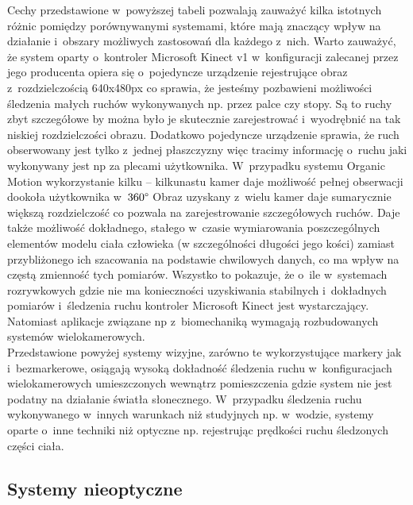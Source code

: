 Cechy przedstawione w~powyższej tabeli pozwalają zauważyć kilka istotnych różnic pomiędzy porównywanymi systemami, które mają znaczący wpływ na działanie i~obszary możliwych zastosowań dla każdego z~nich. Warto zauważyć, że system oparty o~kontroler Microsoft Kinect v1 w~konfiguracji zalecanej przez jego producenta opiera się o~pojedyncze urządzenie rejestrujące obraz z~rozdzielczością 640x480px co sprawia, że jesteśmy pozbawieni możliwości śledzenia małych ruchów wykonywanych np. przez palce czy stopy. Są to ruchy zbyt szczegółowe by można było je skutecznie zarejestrować i~wyodrębnić na tak niskiej rozdzielczości obrazu. Dodatkowo pojedyncze urządzenie sprawia, że ruch obserwowany jest tylko z~jednej płaszczyzny więc tracimy informację o~ruchu jaki wykonywany jest np za plecami użytkownika. W~przypadku systemu Organic Motion wykorzystanie kilku -- kilkunastu kamer daje możliwość pełnej obserwacji dookoła użytkownika w~$360\degree$ Obraz uzyskany z~wielu kamer daje sumarycznie większą rozdzielczość co pozwala na zarejestrowanie szczegółowych ruchów. Daje także możliwość dokładnego, stałego w~czasie wymiarowania poszczególnych elementów modelu ciała człowieka (w szczególności długości jego kości) zamiast przybliżonego ich szacowania na podstawie chwilowych danych, co ma wpływ na częstą zmienność tych pomiarów. Wszystko to pokazuje, że o~ile w~systemach rozrywkowych gdzie nie ma konieczności uzyskiwania stabilnych i~dokładnych pomiarów i~śledzenia ruchu kontroler Microsoft Kinect jest wystarczający. Natomiast aplikacje związane np z~biomechaniką wymagają rozbudowanych systemów wielokamerowych.\\

Przedstawione powyżej systemy wizyjne, zarówno te wykorzystujące markery jak i~bezmarkerowe, osiągają wysoką dokładność śledzenia ruchu w~konfiguracjach wielokamerowych umieszczonych wewnątrz pomieszczenia gdzie system nie jest podatny na działanie światła słonecznego. W~przypadku śledzenia ruchu wykonywanego w~innych warunkach niż studyjnych np. w~wodzie, systemy oparte o~inne techniki niż optyczne np. rejestrując prędkości ruchu śledzonych części ciała.

\subsection{Systemy nieoptyczne}

